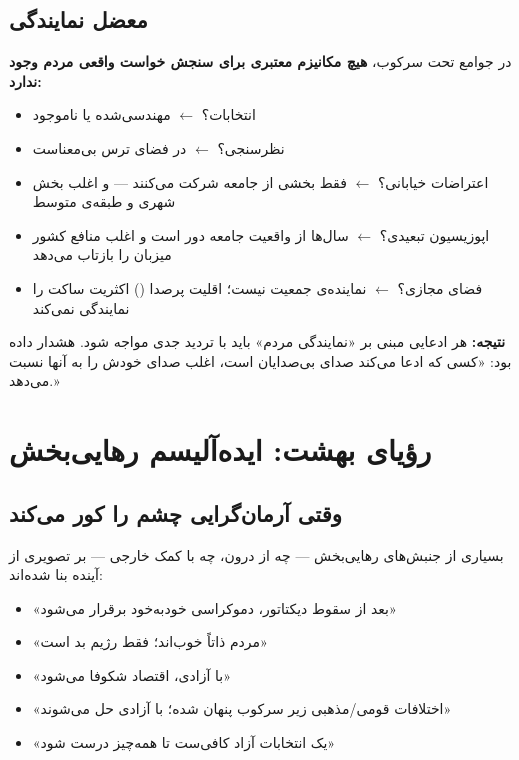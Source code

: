 \subsection{معضل نمایندگی}

\begin{tcolorbox}[enemybox, title={مسئله‌ی بنیادین}]
در جوامع تحت سرکوب، \textbf{هیچ مکانیزم معتبری برای سنجش خواست واقعی
مردم وجود ندارد:}
\begin{itemize}
\item انتخابات؟ $\leftarrow$ مهندسی‌شده یا ناموجود
\item نظرسنجی؟ $\leftarrow$ در فضای ترس بی‌معناست
\item اعتراضات خیابانی؟ $\leftarrow$ فقط بخشی از جامعه شرکت می‌کنند —
و اغلب بخش شهری و طبقه‌ی متوسط
\item اپوزیسیون تبعیدی؟ $\leftarrow$ سال‌ها از واقعیت جامعه دور است و
اغلب منافع کشور میزبان را بازتاب می‌دهد
\item فضای مجازی؟ $\leftarrow$ نماینده‌ی جمعیت نیست؛ اقلیت پرصدا
() اکثریت ساکت را نمایندگی نمی‌کند
\end{itemize}

\textbf{نتیجه:} هر ادعایی مبنی بر «نمایندگی مردم» باید با تردید جدی
مواجه شود.  هشدار داده بود: «کسی که ادعا می‌کند
صدای بی‌صدایان است، اغلب صدای خودش را به آنها نسبت می‌دهد.»
\end{tcolorbox}


\section{رؤیای بهشت: ایده‌آلیسم رهایی‌بخش}
\label{sec:ch15-idealism}

\subsection{وقتی آرمان‌گرایی چشم را کور می‌کند}

بسیاری از جنبش‌های رهایی‌بخش — چه از درون، چه با کمک خارجی — بر تصویری
 از آینده بنا شده‌اند:

\begin{itemize}
\item «بعد از سقوط دیکتاتور، دموکراسی خودبه‌خود برقرار می‌شود»
\item «مردم ذاتاً خوب‌اند؛ فقط رژیم بد است»
\item «با آزادی، اقتصاد شکوفا می‌شود»
\item «اختلافات قومی/مذهبی زیر سرکوب پنهان شده؛ با آزادی حل می‌شوند»
\item «یک انتخابات آزاد کافی‌ست تا همه‌چیز درست شود»
\end{itemize}

